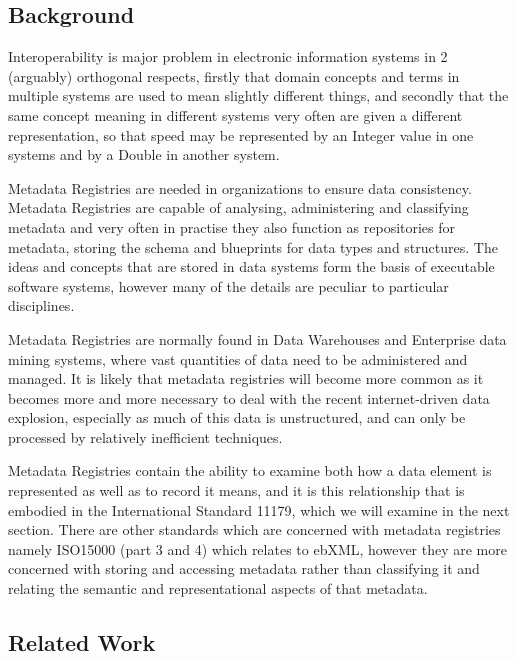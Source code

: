 \subsection{Background}

Interoperability is major problem in electronic information systems in 2 (arguably) orthogonal respects, firstly that domain concepts and terms in multiple systems are used to mean slightly different things, and secondly that the same concept meaning in different systems very often are given a different representation, so that speed may be represented by an Integer value in one systems and by a Double in another system.

Metadata Registries are needed in organizations to ensure data consistency. Metadata Registries are capable of analysing, administering and classifying metadata and very often in practise they also function as repositories for metadata, storing the schema and blueprints for data types and structures. The ideas and concepts that are stored in data systems form the basis of executable software systems, however many of the details are peculiar to particular disciplines.  

Metadata Registries are normally found in Data Warehouses and Enterprise data mining systems, where vast quantities of data need to be administered and managed. It is likely that metadata registries will become more common as it becomes more and more necessary to deal with the recent internet-driven data explosion, especially as much of this data is unstructured, and can only be processed by relatively inefficient techniques.

Metadata Registries contain the ability to examine both how a data element is represented as well as to record it means, and it is this relationship that is embodied in the International Standard 11179, which we will examine in the next section. There are other standards which are concerned with metadata registries namely ISO15000 (part 3 and 4)  which relates to ebXML, however they are more concerned with storing and accessing metadata rather than classifying it and relating the semantic and representational aspects of that metadata.


\subsection{Related Work}

